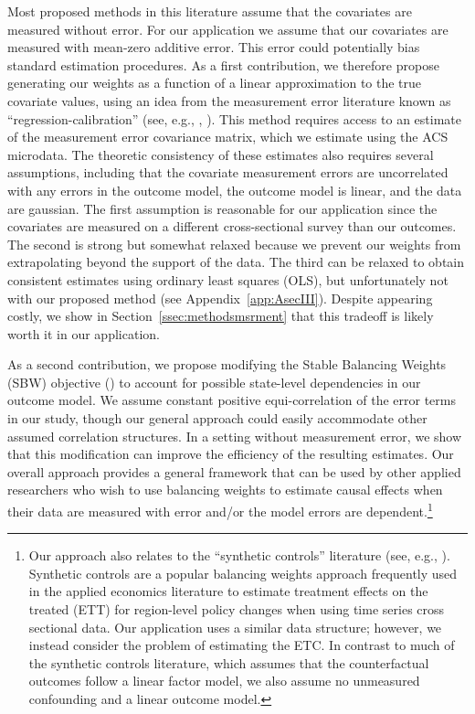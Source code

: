 \documentclass[aoas]{imsart}
\theoremstyle{plain}
\theoremstyle{remark}
\begin{document}
Most proposed methods in this literature assume that the covariates are measured without error. For our application we assume that our covariates are measured with mean-zero additive error. This error could potentially bias standard estimation procedures. As a first contribution, we therefore propose generating our weights as a function of a linear approximation to the true covariate values, using an idea from the measurement error literature known as ``regression-calibration'' (see, e.g., \cite{carroll2006measurement}, \cite{gleser1992importance}). This method requires access to an estimate of the measurement error covariance matrix, which we estimate using the ACS microdata. The theoretic consistency of these estimates also requires several assumptions, including that the covariate measurement errors are uncorrelated with any errors in the outcome model, the outcome model is linear, and the data are gaussian. The first assumption is reasonable for our application since the covariates are measured on a different cross-sectional survey than our outcomes. The second is strong but somewhat relaxed because we prevent our weights from extrapolating beyond the support of the data. The third can be relaxed to obtain consistent estimates using ordinary least squares (OLS), but unfortunately not with our proposed method (see Appendix~\ref{app:AsecIII}). Despite appearing costly, we show in Section~\ref{ssec:methodsmsrment} that this tradeoff is likely worth it in our application.

As a second contribution, we propose modifying the Stable Balancing Weights (SBW) objective (\cite{zubizarreta2015stable}) to account for possible state-level dependencies in our outcome model. We assume constant positive equi-correlation of the error terms in our study, though our general approach could easily accommodate other assumed correlation structures. In a setting without measurement error, we show that this modification can improve the efficiency of the resulting estimates. Our overall approach provides a general framework that can be used by other applied researchers who wish to use balancing weights to estimate causal effects when their data are measured with error and/or the model errors are dependent.\footnote{Our approach also relates to the ``synthetic controls'' literature (see, e.g., \cite{abadie2010synthetic}). Synthetic controls are a popular balancing weights approach frequently used in the applied economics literature to estimate treatment effects on the treated (ETT) for region-level policy changes when using time series cross sectional data. Our application uses a similar data structure; however, we instead consider the problem of estimating the ETC. In contrast to much of the synthetic controls literature, which assumes that the counterfactual outcomes follow a linear factor model, we also assume no unmeasured confounding and a linear outcome model.}
\end{document}
